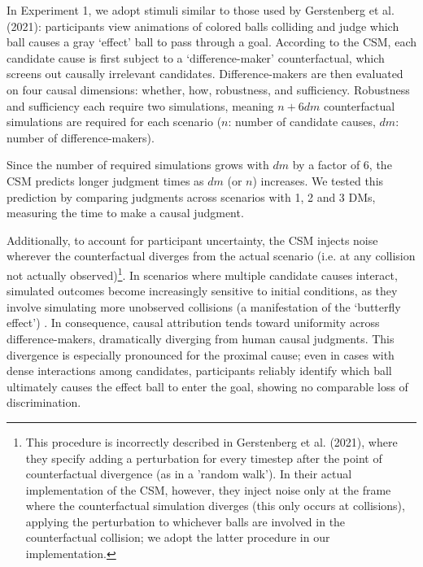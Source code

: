 \documentclass[10pt,letterpaper]{article}
\begin{document}
In Experiment 1, we adopt stimuli similar to those used by Gerstenberg et al. (2021): participants view animations of colored balls colliding and judge which ball causes a gray ‘effect’ ball to pass through a goal. According to the CSM, each candidate cause is first subject to a ‘difference-maker’ counterfactual, which screens out causally irrelevant candidates. Difference-makers are then evaluated on four causal dimensions: whether, how, robustness, and sufficiency. Robustness and sufficiency each require two simulations, meaning $n + 6dm$ counterfactual simulations are required for each scenario ($n$: number of candidate causes, $dm$:  number of difference-makers).

Since the number of required simulations grows with $dm$ by a factor of 6, the CSM predicts longer judgment times as $dm$ (or $n$) increases. We tested this prediction by comparing judgments across scenarios with 1, 2 and 3 DMs, measuring the time to make a causal judgment.

Additionally, to account for participant uncertainty, the CSM injects noise wherever the counterfactual diverges from the actual scenario (i.e. at any collision not actually observed)\footnote{This procedure is incorrectly described in Gerstenberg et al. (2021), where they specify adding a perturbation for every timestep after the point of counterfactual divergence (as in a 'random walk'). In their actual implementation of the CSM, however, they inject noise only at the frame where the counterfactual simulation diverges (this only occurs at collisions), applying the perturbation to whichever balls are involved in the counterfactual collision; we adopt the latter procedure in our implementation.}. In scenarios where multiple candidate causes interact, simulated outcomes become increasingly sensitive to initial conditions, as they involve simulating more unobserved collisions (a manifestation of the ‘butterfly effect’) . In consequence, causal attribution tends toward uniformity across difference-makers, dramatically diverging from human causal judgments. This divergence is especially pronounced for the proximal cause; even in cases with dense interactions among candidates, participants reliably identify which ball ultimately causes the effect ball to enter the goal, showing no comparable loss of discrimination.
\end{document}
